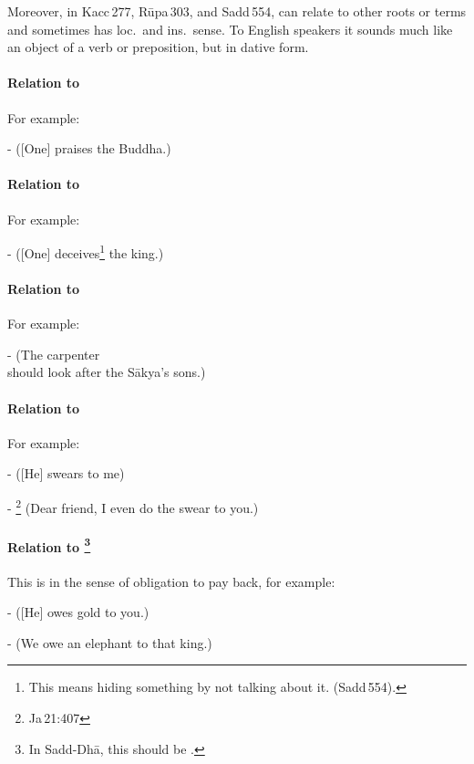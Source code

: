 Moreover, in Kacc\,277, R\=upa\,303, and Sadd\,554,  can relate to other roots or terms and sometimes has loc.\ and ins.\ sense. To English speakers it sounds much like an object of a verb or preposition, but in dative form.

\paragraph*{Relation to } For example:\par
-  ([One] praises the Buddha.)\par

\paragraph*{Relation to } For example:\par
-  ([One] deceives\footnote{This means hiding something by not talking about it.  (Sadd\,554).} the king.)\par

\paragraph*{Relation to }  For example:\par
-  (The carpenter \\should look after the S\=akya's sons.)\par

\paragraph*{Relation to } For example:\par
-  ([He] swears to me)\par
- \footnote{Ja\,21:407} (Dear friend, I even do the swear to you.)\par

\paragraph*{Relation to \footnote{In Sadd-Dh\=a, this should be .}} This is in the sense of obligation to pay back, for example:\par
-  ([He] owes gold to you.)\par
-  (We owe an elephant to that king.)\par

